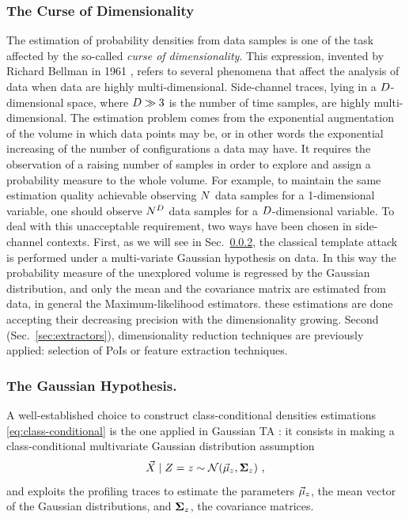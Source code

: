 \subsubsection{The Curse of Dimensionality}
The estimation of probability densities from data samples is one of the task affected by the so-called \emph{curse of dimensionality}. This expression, invented by Richard Bellman in 1961 \cite{bellman2015adaptive}, refers to several phenomena that affect the analysis of data when data are highly multi-dimensional. Side-channel traces, lying in a $D$-dimensional space, where $D\gg 3$ is the number of time samples, are highly multi-dimensional. The estimation problem comes from the exponential augmentation of the volume in which data points may be, or in other words the exponential increasing of the number of configurations a data may have. It requires the observation of a raising number of samples in order to explore and assign a probability measure to the whole volume. For example, to maintain the same estimation quality achievable observing $N$ data samples for a 1-dimensional variable, one should observe $N^D$ data samples for a $D$-dimensional variable. To deal with this unacceptable requirement, two ways have been chosen in side-channel contexts. First, as we will see in Sec.~\ref{sec:gauss_hp}, the classical template attack is performed under a multi-variate Gaussian hypothesis on data. In this way the probability measure of the unexplored volume is regressed by the Gaussian distribution, and only the mean and the covariance matrix are estimated from data, in general \via the  Maximum-likelihood estimators. these estimations are done accepting their decreasing precision with the dimensionality growing. Second (Sec.~\ref{sec:extractors}), dimensionality reduction techniques are previously applied: selection of PoIs or feature extraction techniques. 

\subsubsection{The Gaussian Hypothesis.}\label{sec:gauss_hp} A well-established choice to construct class-conditional densities estimations \ref{eq:class-conditional} is the one applied in Gaussian TA \cite{Chari2003}: it consists in making a class-conditional multivariate Gaussian distribution assumption
\begin{equation}\label{eq:gaussian_assumption}
\given{\vaLeakVec}{\sensRandVar} =\sensVar \sim \mathcal{N}(\mumumu_\sensVar, \boldsymbol{\Sigma}_\sensVar)\mbox{ ,}
\end{equation} 
and exploits the profiling traces to estimate the  parameters $\vec{\mu}_z$, \ie the mean vector of the Gaussian distributions, and $ \boldsymbol{\Sigma}_z$, \ie the covariance matrices. \\

